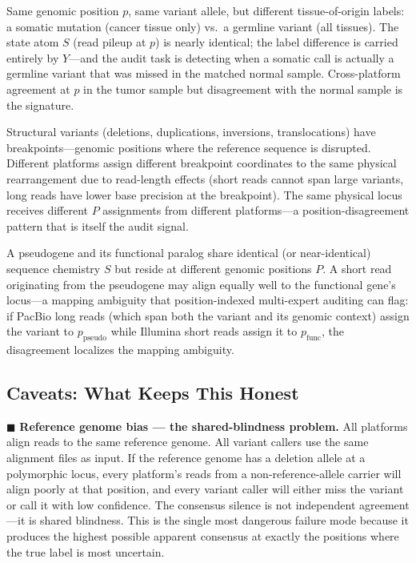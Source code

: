 \documentclass[12pt,a4paper]{article}
\begin{document}
\begin{description}[leftmargin=1.5cm]
\item[\textbf{Somatic vs.\ germline confusion}\cite{sedlazeck2018}.] Same genomic position $p$, same variant allele, but different tissue-of-origin labels: a somatic mutation (cancer tissue only) vs.\ a germline variant (all tissues). The state atom $S$ (read pileup at $p$) is nearly identical; the label difference is carried entirely by $Y$---and the audit task is detecting when a somatic call is actually a germline variant that was missed in the matched normal sample. Cross-platform agreement at $p$ in the tumor sample but disagreement with the normal sample is the signature.
\item[\textbf{Structural variant breakpoint discordance}.] Structural variants (deletions, duplications, inversions, translocations) have breakpoints---genomic positions where the reference sequence is disrupted. Different platforms assign different breakpoint coordinates to the same physical rearrangement due to read-length effects (short reads cannot span large variants, long reads have lower base precision at the breakpoint). The same physical locus receives different $P$ assignments from different platforms---a position-disagreement pattern that is itself the audit signal.
\item[\textbf{Pseudogene discrimination}.] A pseudogene and its functional paralog share identical (or near-identical) sequence chemistry $S$ but reside at different genomic positions $P$. A short read originating from the pseudogene may align equally well to the functional gene's locus---a mapping ambiguity that position-indexed multi-expert auditing can flag: if PacBio long reads (which span both the variant and its genomic context) assign the variant to $p_{\text{pseudo}}$ while Illumina short reads assign it to $p_{\text{func}}$, the disagreement localizes the mapping ambiguity.
\end{description}

\subsection{Caveats: What Keeps This Honest}

\textcolor{warning}{$\blacksquare$ \textbf{Reference genome bias — the shared-blindness problem.}} All platforms align reads to the same reference genome. All variant callers use the same alignment files as input. If the reference genome has a deletion allele at a polymorphic locus, every platform's reads from a non-reference-allele carrier will align poorly at that position, and every variant caller will either miss the variant or call it with low confidence. The consensus silence is not independent agreement---it is shared blindness. This is the single most dangerous failure mode because it produces the highest possible apparent consensus at exactly the positions where the true label is most uncertain.
\end{document}
